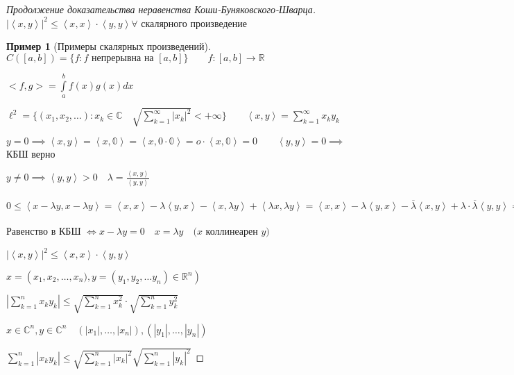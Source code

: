 \documentclass{book}
\newcommand\R{\ensuremath{\mathbb{R}}}
\renewcommand\C{\ensuremath{\mathbb{C}}}
\newcommand{\ov}[1]{\overline{#1}}
\theoremstyle{definition}
\newtheorem*{example}{Пример}
\begin{document}
    \begin{proof}
        [Продолжение доказательства неравенства Коши-Буняковского-Шварца]

        $\left| \left< x, y \right> \right| ^2 \leqslant \left<x, x \right> \cdot  \left< y, y \right> \forall $ скалярного произведение

        \begin{example}
        [Примеры скалярных произведений]

            $C\left( [a,b] \right)  = \{f: f\text{ непрерывна на }[a,b]\}\qquad f:[a,b] \to  \R$

            $<f,g> = \int \limits_a^b f(x)g(x)dx$

            $\ell ^2 = \{(x_1, x_2, \ldots):x_k\in \C\quad \sqrt{ \sum_{k=1}^{\infty } \left| x_k \right|^2} <+\infty  \}\qquad \left< x,y \right> = \sum_{k=1}^{\infty } x_ky_k$
        \end{example}

        $y=0 \implies \left< x, y \right> = \left< x,\mathbb{0} \right> = \left< x, 0\cdot \mathbb{0} \right> = o\cdot \left< x, \mathbb{0} \right> = 0\qquad \left< y, y \right> = 0\implies $ КБШ верно

        $y\neq 0 \implies  \left< y, y \right> >0\quad \lambda = \frac{\left< x, y \right>}{\left< y, y \right>}$

        $0\leqslant \left< x-\lambda y, x-\lambda y \right> = \left< x, x \right> - \lambda \left< y, x \right> - \left< x, \lambda y \right> + \left< \lambda x, \lambda y \right> = \left< x, x \right> - \lambda \left< y, x \right> - \ov{\lambda} \left< x, y \right> + \lambda \cdot  \ov{\lambda} \left< y, y \right> = \left< x, x \right> - \frac{\left| \left< x, y \right> \right| ^2}{\left< y, y \right>} - \frac{\left| \left< x, y \right> \right| ^2}{\left< y, y \right>} + \frac{\left| \left< x, y \right> \right| ^2}{\left< y, y \right>} \implies  \left< x, x \right>\cdot \left< y, y \right> - \left| \left< x, y \right> \right| ^2 \geqslant 0$ 

        Равенство в КБШ $\iff  x-\lambda y = 0\quad x = \lambda y\quad (x$ коллинеарен $y)$  

        $\left| \left< x, y \right> \right| ^2 \leqslant \left< x, x \right> \cdot  \left< y, y \right>$

        $x = \left( x_1, x_2, \ldots, x_{n} ), y = \left( y_1, y_2, \ldots y_{n}  \right)  \in \R^n \right) $

        $\left| \sum_{k=1}^{n} x_{k} y_{k}\right| \leqslant \sqrt{\sum_{k=1}^{n} x_k^2} \cdot \sqrt{\sum_{k=1}^{n} y_k^2}  $

        $x\in \C^n, y\in \C^n\quad \left( |x_1|, \ldots, |x_{n} |\right), \left( |y_1|, \ldots, |y_{n} | \right)   $

        $\sum_{k=1}^{n} |x_ky_k| \leqslant \sqrt{\sum_{k=1}^{n} |x_k|^2} \sqrt{\sum_{k=1}^{n} |y_k|^2}  $
    \end{proof}
\end{document}
